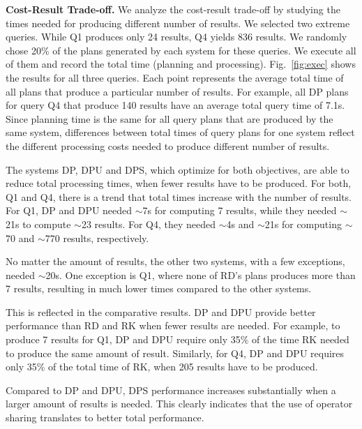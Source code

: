 \textbf{Cost-Result Trade-off.} We analyze the cost-result trade-off
by studying the times needed for producing different number of
results. We selected two extreme queries. While Q1 produces only 24
results, Q4 yields 836 results. We randomly chose 20\% of the plans
generated by each system for these queries. We execute all of them and
record the total time (planning and processing). Fig.~\ref{fig:exec}
shows the results for all three queries. Each point represents the
average total time of all plans that produce a particular number of
results. For example, all DP plans for query Q4 that produce 140
results have an average total query time of 7.1s. Since planning time
is the same for all query plans that are produced by the same system,
differences between total times of query plans for one system reflect
the different processing costs needed to produce different number of
results.

The systems DP, DPU and DPS, which optimize for both objectives, are
able to reduce total processing times, when fewer results have to be
produced. For both, Q1 and Q4, there is a trend that total times
increase with the number of results. For Q1, DP and DPU needed
$\sim$7s for computing 7 results, while they needed $\sim$21s to
compute $\sim$23 results. For Q4, they needed $\sim$4s and $\sim$21s
for computing $\sim$70 and $\sim$770 results, respectively.

No matter the amount of results, the other two systems, with a few
exceptions, needed $\sim$20s. One exception is Q1, where none of RD's
plans produces more than 7 results, resulting in much lower times
compared to the other systems.

This is reflected in the comparative results. DP and DPU provide
better performance than RD and RK when fewer results are needed.  For
example, to produce 7 results for Q1, DP and DPU require only 35\% of
the time RK needed to produce the same amount of result. Similarly,
for Q4, DP and DPU requires only 35\% of the total time of RK, when
205 results have to be produced.

Compared to DP and DPU, DPS performance increases substantially when a
larger amount of results is needed. This clearly indicates that the
use of operator sharing translates to better total performance.

